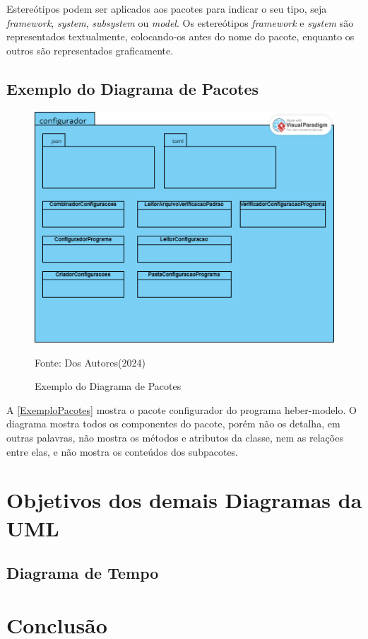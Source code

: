 \documentclass[12pt,openright,oneside,a4paper,
	chapter=TITLE,
	section=TITLE,
	english,brazil]{abntex2}
\begin{document}
Estereótipos podem ser aplicados aos pacotes para indicar o seu tipo, seja \textit{framework}, \textit{system}, \textit{subsystem} ou \textit{model}. Os estereótipos \textit{framework} e \textit{system} são representados textualmente, colocando-os antes do nome do pacote, enquanto os outros são representados graficamente.

\section{Exemplo do Diagrama de Pacotes}

\begin{figure}[!htp]
	\caption{Exemplo do Diagrama de Pacotes}
	\centering
	\includegraphics[scale=0.5]{img/ExemploDiagramaPacotes.png}
	\\

	\label{ExemploPacotes}
	\footnotesize\raggedright Fonte: Dos Autores(2024)
\end{figure}

A \autoref{ExemploPacotes} mostra o pacote configurador do programa heber-modelo. O diagrama mostra todos os componentes do pacote, porém não os detalha, em outras palavras, não mostra os métodos e atributos da classe, nem as relações entre elas, e não mostra os conteúdos dos subpacotes.


\chapter{Objetivos dos demais Diagramas da UML}

\section{Diagrama de Tempo}

\chapter{Conclusão}

\postextual


\nocite{GUEDES}
\nocite{BEZERRA}
\nocite{LARMAN}
\end{document}
